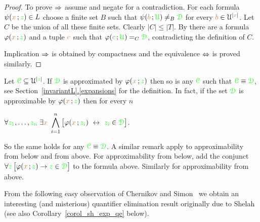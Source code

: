 \documentclass[creche.tex]{subfiles}
\begin{document}
\begin{proof}
To prove $\Rightarrow$ assume  and negate  for a contradiction.
For each formula $\psi({\color{brown} x}\,;{\color{green} z})\in L$ choose a finite set $B$ such that $\psi({\color{brown} b}\,;{\color{green}\EuScript U})\neq_B{\color{green}\EuScript D}$ for every ${\color{brown} b}\in\EuScript U^{|{\color{brown} x}|}$.
Let $C$ be the union of all these finite sets.
Clearly $|C|\le|T|$.
By  there are a formula $\varphi({\color{brown} x}\,;{\color{green} z})$ and a tuple ${\color{brown} c}$ such that $\varphi({\color{brown} c}\,;{\color{green}\EuScript U})=_C{\color{green}\EuScript D}$, contradicting the definition of $C$.

Implication $\Rightarrow$ is obtained by compactness and the equivalence $\Leftrightarrow$ is proved similarly.
\end{proof}



\begin{remark}\label{prop_approx_el_eq}
Let ${\color{green}\EuScript C}\subseteq\EuScript U^{|{\color{green} z}|}$.
If ${\color{green}\EuScript D}$ is approximated by $\varphi({\color{brown} x}\,;{\color{green} z})$ then so is any ${\color{green}\EuScript C}$ such that ${\color{green}\EuScript C}\equiv{\color{green}\EuScript D}$, see Section~\hyperref[expansions]{\ref*{invariantL}.\ref*{expansions}} for the definition.
In fact, if the set ${\color{green}\EuScript D}$ is approximable by $\varphi({\color{brown} x}\,;{\color{green} z})$ then for every $n$

\hfil$\displaystyle\A {\gr z_1},\dots,{\gr z_n}\;\E {\mr x}\ \bigwedge^n_{i=1}\big[\phi({\mr x}\,;{\gr z_i})\ \iff\ {\gr z_i}\in{\gr \D}\big]$.


So the same holds for any ${\color{green}\EuScript C}\equiv{\color{green}\EuScript D}$.
A similar remark apply to approximability from below and from above.
For approximability from below, add the conjunct $\forall {\color{green}z}\,\big[\varphi({\color{brown} x}\,;{\color{green} z})\rightarrow {\color{green}z}\in{\color{green}\EuScript D}\big]$ to the formula above.
Similarly for approximability from above.\QED
\end{remark}

From the following easy observation of Chernikov and Simon~\cite{CS} we obtain an interesting (and misterious) quantifier elimination result originally due to Shelah (see also Corollary~\ref{corol_sh_exp_qe} below).
\end{document}
